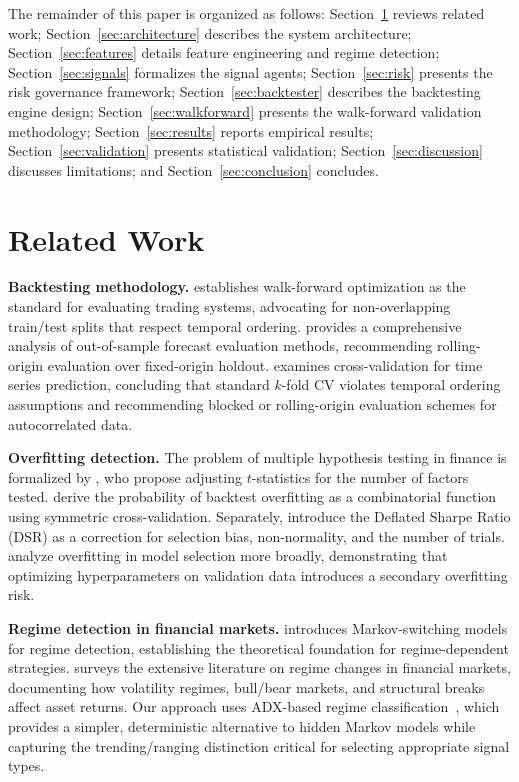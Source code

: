 \documentclass{article}
\begin{document}
The remainder of this paper is organized as follows: Section~\ref{sec:related} reviews related work; Section~\ref{sec:architecture} describes the system architecture; Section~\ref{sec:features} details feature engineering and regime detection; Section~\ref{sec:signals} formalizes the signal agents; Section~\ref{sec:risk} presents the risk governance framework; Section~\ref{sec:backtester} describes the backtesting engine design; Section~\ref{sec:walkforward} presents the walk-forward validation methodology; Section~\ref{sec:results} reports empirical results; Section~\ref{sec:validation} presents statistical validation; Section~\ref{sec:discussion} discusses limitations; and Section~\ref{sec:conclusion} concludes.

\section{Related Work}
\label{sec:related}

\textbf{Backtesting methodology.}
\citet{Pardo2008WFO} establishes walk-forward optimization as the standard for evaluating trading systems, advocating for non-overlapping train/test splits that respect temporal ordering.
\citet{Tashman2000} provides a comprehensive analysis of out-of-sample forecast evaluation methods, recommending rolling-origin evaluation over fixed-origin holdout.
\citet{Bergmeir2012} examines cross-validation for time series prediction, concluding that standard $k$-fold CV violates temporal ordering assumptions and recommending blocked or rolling-origin evaluation schemes for autocorrelated data.

\textbf{Overfitting detection.}
The problem of multiple hypothesis testing in finance is formalized by \citet{Harvey2016CrossSection}, who propose adjusting $t$-statistics for the number of factors tested.
\citet{Bailey2017PBO} derive the probability of backtest overfitting as a combinatorial function using symmetric cross-validation.
Separately, \citet{Bailey2014DSR} introduce the Deflated Sharpe Ratio (DSR) as a correction for selection bias, non-normality, and the number of trials.
\citet{Cawley2010} analyze overfitting in model selection more broadly, demonstrating that optimizing hyperparameters on validation data introduces a secondary overfitting risk.

\textbf{Regime detection in financial markets.}
\citet{Hamilton1989} introduces Markov-switching models for regime detection, establishing the theoretical foundation for regime-dependent strategies.
\citet{Ang2012Regimes} surveys the extensive literature on regime changes in financial markets, documenting how volatility regimes, bull/bear markets, and structural breaks affect asset returns.
Our approach uses ADX-based regime classification~\citep{Wilder1978}, which provides a simpler, deterministic alternative to hidden Markov models while capturing the trending/ranging distinction critical for selecting appropriate signal types.
\end{document}
